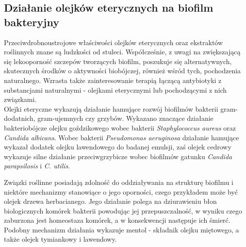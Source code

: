 \documentclass[11pt,a4paper]{report}
\begin{document}
\clearpage

\subsection{Działanie olejków eterycznych na biofilm bakteryjny}
Przeciwdrobnoustrojowe właściwości olejków eterycznych oraz ekstraktów roślinnych znane są ludzkości od stuleci. Współcześnie, z uwagi na zwiększającą się lekooporność szczepów tworzących biofilm, poszukuje się alternatywnych, skutecznych środków o aktywności biobójczej, również wśród tych, pochodzenia naturalnego\cite{budzynska, hammer, budzynska3}. Wzrasta także zainteresowanie terapią łączącą antybiotyki z substancjami naturalnymi - olejkami eterycznymi lub pochodzącymi z nich związkami\cite{budzynska3, budzynska2}.\\
Olejki eteryczne wykazują działanie hamujące rozwój biofilmów bakterii gram-dodatnich, gram-ujemnych czy grzybów. Wykazano znaczące działanie bakteriobójcze olejku goździkowego wobec bakterii \textit{Staphylococcus aureus} oraz \textit{Candida albicans}\cite{budzynska3}. Wobec bakterii \textit{Pseudomonas aeruginosa} działanie hamujące wykazał dodatek olejku lawendowego do badanej emulsji, zaś olejek cedrowy wykazuje silne działanie przeciwgrzybicze wobec biofilmów gatunku \textit{Candida parapsilosis} i \textit{C. utilis}\cite{kom_adaszynska}.

Związki roślinne posiadają zdolność do oddziaływania na strukturę biofilmu i niektóre mechanizmy stanowiące o jego oporności, czego przykładem może być olejek drzewa herbacianego. 
Jego działanie polega na dziurawieniu błon biologicznych komórek bakterii powodując jej przepuszczalność, w wyniku czego zaburzona jest homeostaza komórek, a w konsekwencji następuje ich śmierć\cite{drzewo1}. Podobny mechanizm działania wykazuje mentol - składnik olejku miętowego, a także olejek tymiankowy i lawendowy\cite{kom_trytek}.\\






\end{document}
